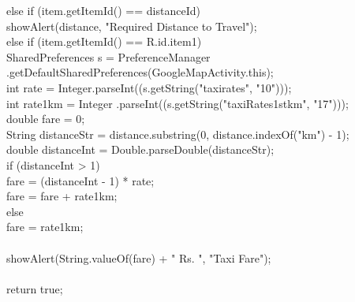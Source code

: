 \documentclass[12pt,a4paper]{article}
\begin{document}
{{{		} else if (item.getItemId() == distanceId) {\\
			showAlert(distance, "Required Distance to Travel");\\
		} else if (item.getItemId() == R.id.item1) {\\
			SharedPreferences s = PreferenceManager
					.getDefaultSharedPreferences(GoogleMapActivity.this);\\
			int rate = Integer.parseInt((s.getString("taxirates", "10")));\\
			int rate1km = Integer
					.parseInt((s.getString("taxiRates1stkm", "17")));\\
			double fare = 0;\\
			String distanceStr = distance.substring(0,
					distance.indexOf("km") - 1);\\
			double distanceInt = Double.parseDouble(distanceStr);\\
			if (distanceInt > 1) {\\
				fare = (distanceInt - 1) * rate;\\
				fare = fare + rate1km;\\
			} else {\\
				fare = rate1km;\\
			}\\

			showAlert(String.valueOf(fare) + " Rs. ", "Taxi Fare");\\
		}\\
		return true;\\

	}\\
	\\
	
\newpage
\\
}
\end{document}
